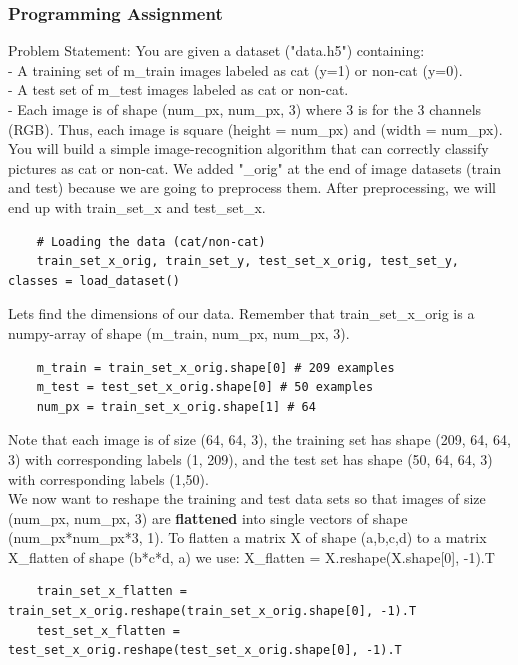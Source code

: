 \documentclass[11pt, a4paper]{article}
\begin{document}
\begin{spacing}{1.1}
	\subsubsection{Programming Assignment}
	Problem Statement: You are given a dataset ("data.h5") containing: \\
	\hspace*{3mm} - A training set of m\_train images labeled as cat (y=1) or non-cat (y=0). \\
	\hspace*{3mm} - A test set of m\_test images labeled as cat or non-cat. \\
	\hspace*{3mm} - Each image is of shape (num\_px, num\_px, 3) where 3 is for the 3 channels (RGB). Thus, each image \hspace*{6mm} is square (height = num\_px) and (width = num\_px). \vspace*{1mm} \\
	You will build a simple image-recognition algorithm that can correctly classify pictures as cat or non-cat. We added "\_orig" at the end of image datasets (train and test) because we are going to preprocess them. After preprocessing, we will end up with train\_set\_x and test\_set\_x. 
	\begin{lstlisting}
	# Loading the data (cat/non-cat)
	train_set_x_orig, train_set_y, test_set_x_orig, test_set_y, classes = load_dataset() \end{lstlisting} \newpage

	\noindent Lets find the dimensions of our data. Remember that train\_set\_x\_orig is a numpy-array of shape (m\_train, num\_px, num\_px, 3). 
	\begin{lstlisting}
	m_train = train_set_x_orig.shape[0] # 209 examples
	m_test = test_set_x_orig.shape[0] # 50 examples
	num_px = train_set_x_orig.shape[1] # 64 \end{lstlisting} \vspace*{1mm} 
	Note that each image is of size (64, 64, 3), the training set has shape (209, 64, 64, 3) with corresponding labels (1, 209), and the test set has shape (50, 64, 64, 3) with corresponding labels (1,50). \vspace*{2mm} \\
	We now want to reshape the training and test data sets so that images of size (num\_px, num\_px, 3) are \textbf{flattened} into single vectors of shape (num\_px*num\_px*3, 1). To flatten a matrix X of shape (a,b,c,d) to a matrix X\_flatten of shape (b*c*d, a) we use: X\_flatten = X.reshape(X.shape[0], -1).T
	\begin{lstlisting}
	train_set_x_flatten = train_set_x_orig.reshape(train_set_x_orig.shape[0], -1).T
	test_set_x_flatten = test_set_x_orig.reshape(test_set_x_orig.shape[0], -1).T 
	

\end{lstlisting}
\end{spacing}
\end{document}
